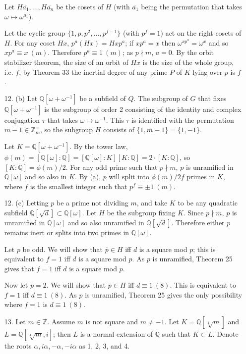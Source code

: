 \documentclass{article}
\newcommand{\w}[0]{\omega}
\newcommand{\Q}[0]{\mathbb{Q}}
\newcommand{\Z}[0]{\mathbb{Z}}
\newcommand{\modequiv}[3]{#1 \equiv #2\ (#3)}
\begin{document}
\begin{enumerate}
Let $H\overline{a_1}, \ldots, H\overline{a_n}$ be the cosets of $H$ (with $\overline{a_1}$ being the permutation that takes $\w \mapsto \w^{a_1}$).

Let the cyclic group $\{1, p, p^2, \ldots, p^{f-1} \}$ (with $p^{f} = 1$) act on the right cosets of $H$.  For any coset $Hx$, $p^{a}(Hx) = Hxp^{a}$; if $xp^{a} = x$ then $\w^{xp^{a}} = \w^{x}$ and so $\modequiv{xp^{a}}{x}{m}$.  Therefore $\modequiv{p^a}{1}{m}$; as $p \nmid m$, $a = 0$.  By the orbit stabilizer theorem, the size of an orbit of $Hx$ is the size of the whole group, i.e. $f$, by Theorem 33 the inertial degree of any prime $P$ of $K$ lying over $p$ is $f$.

\item [12. (b)] Let $\Q[\w + \w^{-1}]$ be a subfield of $Q$.  The subgroup of $G$ that fixes $\Q[\w + \w^{-1}]$ is the subgroup of order 2 consisting of the identity and complex conjugation $\tau$ that takes $\omega \mapsto \omega^{-1}$.  This $\tau$ is identified with the permutation $m - 1 \in \Z^{\times}_{m}$, so the subgroup $H$ consists of $\{1, m - 1 \} = \{1, -1 \}$.

Let $K = \Q[\w + \w^{-1}]$.  By the tower law, $\phi(m) = [\Q[\w] : \Q] = [\Q[\w] : K][K : \Q] = 2 \cdot[K : \Q]$, so $[K : \Q] = \phi(m) / 2$.  For any odd prime such that $p \nmid m$, $p$ is unramified in $\Q[\w]$ and so also in $K$.  By (a), $p$ will split into $\phi(m) / 2f$ primes in $K$, where $f$ is the smallest integer such that $\modequiv{p^f}{\pm 1}{m}$.

\item [12. (c)] Letting $p$ be a prime not dividing $m$, and take $K$ to be any quadratic subfield $\Q[\sqrt{d}] \subset \Q[\w]$.  Let $H$ be the subgroup fixing $K$. Since $p \nmid m$, $p$ is unramified in $\Q[\w]$ and so also unramified in $\Q[\sqrt{d}]$.  Therefore either $p$ remains inert or splits into two primes in $\Q[\w]$.

Let $p$ be odd. We will show that $\bar{p} \in H$ iff $d$ is a square mod $p$; this is equivalent to $f = 1$ iff $d$ is a square mod $p$.  As $p$ is unramified, Theorem 25 gives that $f = 1$ iff $d$ is a square mod $p$.

Now let $p = 2$.  We will show that $\bar{p} \in H$ iff $\modequiv{d}{1}{8}$.  This is equivalent to $f = 1$ iff $\modequiv{d}{1}{8}$.  As $p$ is unramified, Theorem 25 gives the only possibility where $f = 1$ is $\modequiv{d}{1}{8}$.

\item [13.] Let $m \in \Z$.  Assume $m$ is not square and $m \neq -1$.  Let $K = \Q[\sqrt[4]{m}]$ and $L = \Q[\sqrt[4]{m}, i]$; then $L$ is a normal extension of $\Q$ such that $K \subset L$.  Denote the roots $\alpha, i\alpha, -\alpha, -i\alpha$ as 1, 2, 3, and 4.


\end{enumerate}
\end{document}
